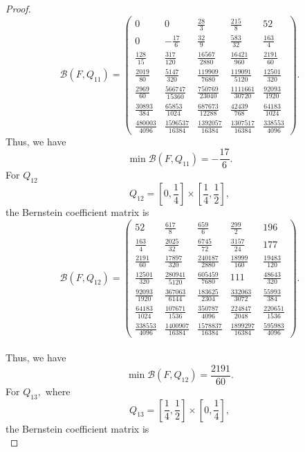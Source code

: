 \documentclass[a4paper,12pt,reqno]{amsart} %
\numberwithin{equation}{section}
\theoremstyle{definition}
\begin{document}
\begin{proof}
\[
\mathcal B(F,Q_{11})=
\begin{pmatrix}
	0 & 0 & \frac{28}{3} & \frac{215}{8} & 52\\[5mm]
	0 & -\frac{17}{6} & \frac{32}{9} & \frac{583}{32} & \frac{163}{4}\\[5mm]
	\frac{128}{15} & \frac{317}{120} & \frac{16567}{2880} & \frac{16421}{960} & \frac{2191}{60}\\[5mm]
	\frac{2019}{80} & \frac{5147}{320} & \frac{119909}{7680} & \frac{119091}{5120} & \frac{12501}{320}\\[5mm]
	\frac{2969}{60} & \frac{566747}{15360} & \frac{750769}{23040} & \frac{1111661}{30720} & \frac{92093}{1920}\\[5mm]
	\frac{30893}{384} & \frac{65853}{1024} & \frac{687673}{12288} & \frac{42439}{768} & \frac{64183}{1024}\\[5mm]
	\frac{480003}{4096} & \frac{1596537}{16384} & \frac{1392057}{16384} & \frac{1307517}{16384} & \frac{338553}{4096}
\end{pmatrix}.
\]
Thus, we have
\[
\min \mathcal B(F,Q_{11})=-\frac{17}{6}.
\]
For $Q_{12}$
\[
Q_{12}=\left[0,\frac14\right]\times\left[\frac14,\frac12\right],
\]
the Bernstein coefficient matrix is\\
\[
\mathcal B(F,Q_{12})=
\begin{pmatrix}
	52 & \frac{617}{8} & \frac{659}{6} & \frac{299}{2} & 196\\[5mm]
	\frac{163}{4} & \frac{2025}{32} & \frac{6745}{72} & \frac{3157}{24} & 177\\[5mm]
	\frac{2191}{60} & \frac{17897}{320} & \frac{240187}{2880} & \frac{18999}{160} & \frac{19483}{120}\\[5mm]
	\frac{12501}{320} & \frac{280941}{5120} & \frac{605459}{7680} & 111 & \frac{48643}{320}\\[5mm]
	\frac{92093}{1920} & \frac{367063}{6144} & \frac{183625}{2304} & \frac{332063}{3072} & \frac{55993}{384}\\[5mm]
	\frac{64183}{1024} & \frac{107671}{1536} & \frac{350787}{4096} & \frac{224847}{2048} & \frac{220651}{1536}\\[5mm]
	\frac{338553}{4096} & \frac{1400907}{16384} & \frac{1578837}{16384} & \frac{1899297}{16384} & \frac{595983}{4096}
\end{pmatrix}.
\]\\
Thus, we have
\[
\min \mathcal B(F,Q_{12})=\frac{2191}{60}.
\]
For $Q_{13},$ where
\[
Q_{13}=\left[\frac14,\frac12\right]\times\left[0,\frac14\right],
\]
the Bernstein coefficient matrix is\\

\end{proof}
\end{document}
